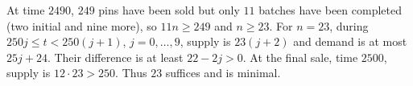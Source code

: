 At time $2490$, $249$ pins have been sold but only $11$ batches have been completed (two initial and nine more), so $11n\ge249$ and $n\ge23$. For $n=23$, during $250j\le t<250(j+1)$, $j=0,\ldots,9$, supply is $23(j+2)$ and demand is at most $25j+24$. Their difference is at least $22-2j>0$. At the final sale, time $2500$, supply is $12\cdot23>250$. Thus $\boxed{23}$ suffices and is minimal.
